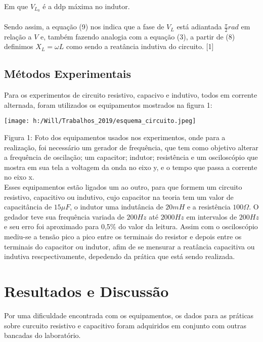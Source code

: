 \documentclass[a4paper, 12pt]{article}
\begin{document}
\begin{multicols}{2}
\paragraph{} Em que $V_{L_0}$ é a ddp máxima no indutor.

\paragraph{} Sendo assim, a equação (9) nos indica que a fase de $V_L$ está adiantada $\frac{\pi}{2} rad$ em relação a $V$ e, também fazendo analogia com a equação (3), a partir de (8) definimos $X_L = \omega L$ como sendo a reatância indutiva do circuito. [1]

\subsection{Métodos Experimentais}
Para os experimentos de circuito resistivo, capacivo e indutivo, todos em corrente alternada, foram utilizados os equipamentos mostrados na figura 1:
\begin{center}
\begingroup
    \centering
    \texttt{[image: h:/Will/Trabalhos\_2019/esquema\_circuito.jpeg]}
\endgroup
\end{center}
Figura 1: Foto dos equipamentos usados nos experimentos, onde para a realização, foi necessário um gerador de frequência, que tem como objetivo alterar a frequência de oscilação; um capacitor; indutor; resistência e um osciloscópio que mostra em sua tela a voltagem da onda no eixo y, e o tempo que passa a corrente no eixo x. \\

Esses equipamentos estão ligados um ao outro, para que formem um circuito resistivo, capacitivo ou indutivo, cujo capacitor na teoria tem um valor de capacitância de $15 \mu F$, o indutor uma indutância de $20 mH$ e a resistência $100 \Omega$. O gedador teve sua frequência variada de $200 Hz$ até $2000 Hz$ em intervalos de $200 Hz$ e seu erro foi aproximado para 0,5\% do valor da leitura. Assim com o osciloscópio mediu-se a tensão pico a pico entre os terminais do resistor e depois entre os terminais do capacitor ou indutor, afim de se mensurar a reatância capacitiva ou indutiva rescpectivamente, depedendo da prática que está sendo realizada.
\section{Resultados e Discussão}
Por uma dificuldade encontrada com os equipamentos, os dados para as práticas sobre curcuito resistivo e capacitivo foram adquiridos em conjunto com outras bancadas do laboratório.

\end{multicols}
\end{document}

